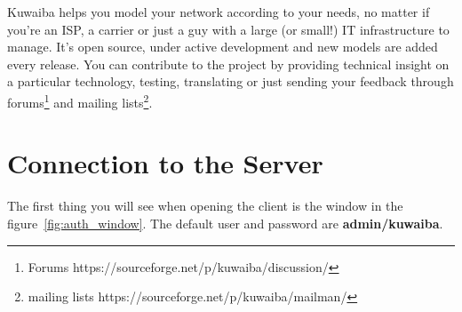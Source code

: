 \documentclass[a4paper]{article}
\begin{document}
	Kuwaiba helps you model your network according to your needs, no matter if you're an ISP, a carrier or just a guy with a large (or small!) IT infrastructure to manage. It's open source, under active development and new models are added every release. You can contribute to the project by providing technical insight on a particular technology, testing, translating or just sending your feedback through forums\footnote{Forums https://sourceforge.net/p/kuwaiba/discussion/} and mailing lists\footnote{mailing lists https://sourceforge.net/p/kuwaiba/mailman/}.
	
	\newpage
	\section{Connection to the Server}
	The first thing you will see when opening the client is the window in the figure~\ref{fig:auth_window}. The default user and password are \textbf{admin/kuwaiba}.
	 
\end{document}
